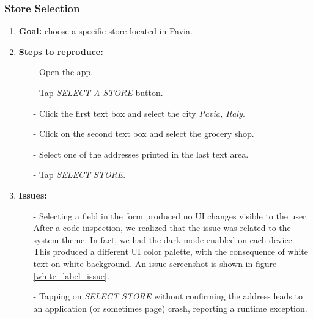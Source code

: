 \documentclass[table, 12pt]{article}
\begin{document}
\subsubsection{Store Selection}
\label{store_selection}
\begin{enumerate}[i]
    \item \textbf{Goal:} choose a specific store located in Pavia.
    \item \textbf{Steps to reproduce:}
          \begin{itemize}
              \item[-] Open the app.
              \item[-] Tap \textit{SELECT A STORE} button.
              \item[-] Click the first text box and select the city \textit{Pavia, Italy}.
              \item[-] Click on the second text box and select the grocery shop.
              \item[-] Select one of the addresses printed in the last text area.
              \item[-] Tap \textit{SELECT STORE}.
          \end{itemize}
    \item \textbf{Issues:}
          \begin{itemize}
              \item[-] Selecting a field in the form produced no UI changes visible to the user. After a code inspection, we realized that the issue was related to the system theme. In fact, we had the dark mode enabled on each device. This produced a different UI color palette, with the consequence of white text on white background. An issue screenshot is shown in figure \ref{white_label_issue}.
              \item[-] Tapping on \textit{SELECT STORE} without confirming the address leads to an application (or sometimes page) crash, reporting a runtime exception.
          \end{itemize}
\end{enumerate}
\end{document}
